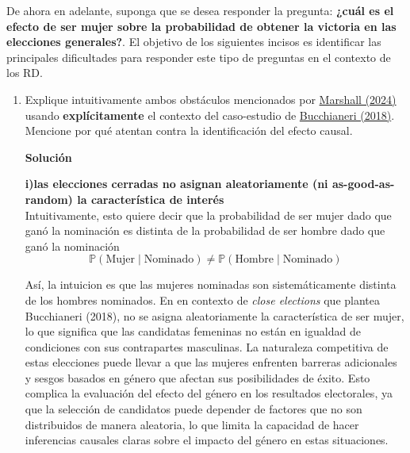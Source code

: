 \documentclass[a4paper, answers, addpoints, 11pt]{exam}
\newenvironment{solucion}{%
  \begin{mdframed}[
    backgroundcolor=blue!5,    %
    linecolor=blue!50,          %
    linewidth=2pt,              %
    leftmargin=10pt,            %
    rightmargin=8pt,           %
    topline=true,              %
    bottomline=true,            %
    roundcorner=10pt,           %
    innerleftmargin=10pt,       %
    innerrightmargin=10pt,      %
    innerbottommargin=10pt,     %
    innertopmargin=10pt         %
  ]%
  \begin{tcolorbox}[colframe=blue!50!black, colback=blue!50, coltitle=white, sharp corners=all, boxrule=1mm, width=\textwidth, halign=left, valign=center, top=0mm, bottom=0mm, left=0mm, right=0mm] \textbf{Solución} \end{tcolorbox} }{\end{mdframed}}
\begin{document}
De ahora en adelante, suponga que se desea responder la pregunta: \textbf{¿cuál es el efecto de ser mujer sobre la probabilidad de obtener la victoria en las elecciones generales?}. El objetivo de los siguientes incisos es identificar las principales dificultades para responder este tipo de preguntas en el contexto de los RD.

\bigskip

\begin{enumerate}[resume]
    
\item Explique intuitivamente ambos obstáculos mencionados por \href{https://onlinelibrary-wiley-com.ezproxy.uniandes.edu.co/doi/full/10.1111/ajps.12741}{Marshall (2024)} usando \textbf{explícitamente} el contexto del caso-estudio de \href{https://link.springer.com/article/10.1007/s11109-017-9407-7}{Bucchianeri (2018)}. Mencione por qué atentan contra la identificación del efecto causal. 

        \begin{solucion}
\textbf{i)las elecciones cerradas no asignan aleatoriamente (ni as-good-as-random) la
característica de interés}\\
Intuitivamente, esto quiere decir que la probabilidad de ser mujer dado que ganó la nominación es distinta de la probabilidad de ser hombre dado que ganó la nominación
\[
    \mathbb{P}(\text{Mujer} \mid \text{Nominado}) \neq \mathbb{P}(\text{Hombre} \mid \text{Nominado})
    \]

Así, la intuicion es que las mujeres nominadas son sistemáticamente distinta de los hombres nominados. En en contexto de \textit{close elections} que plantea Bucchianeri (2018), no se asigna aleatoriamente la característica de ser mujer, lo que significa que las candidatas femeninas no están en igualdad de condiciones con sus contrapartes masculinas. La naturaleza competitiva de estas elecciones puede llevar a que las mujeres enfrenten barreras adicionales y sesgos basados en género que afectan sus posibilidades de éxito. Esto complica la evaluación del efecto del género en los resultados electorales, ya que la selección de candidatos puede depender de factores que no son distribuidos de manera aleatoria, lo que limita la capacidad de hacer inferencias causales claras sobre el impacto del género en estas situaciones.


\end{solucion}
\end{enumerate}
\end{document}
